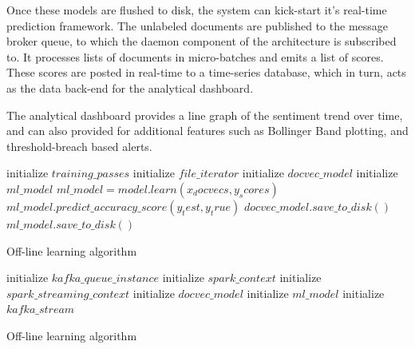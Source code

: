 \documentclass[conference]{IEEEtran}
\begin{document}
        Once these models are flushed to disk, the system can kick-start it's real-time prediction framework. 
        The unlabeled documents are published to the message broker queue, to which the daemon component of the architecture is subscribed to. 
        It processes lists of documents in micro-batches and emits a list of scores. 
        These scores are posted in real-time to a time-series database, which in turn, acts as the data back-end for the analytical dashboard.

        The analytical dashboard provides a line graph of the sentiment trend over time, and can also provided for additional features such as Bollinger Band plotting, and threshold-breach based alerts.

\vspace{5mm}

\begin{algorithm}[ht] \label{offline_module}
    \DontPrintSemicolon 
    \;
    initialize $training\_passes$\;
    initialize $file\_iterator$\;
    initialize $docvec\_model$\;
    initialize $ml\_model$\;
    \;
    \;
    \;
    \;
    $ml\_model = model.learn(x_docvecs, y_scores)$\;
    $ml\_model.predict\_accuracy\_score(y_test, y_true)$\;
    \;
    $docvec\_model.save\_to\_disk()$\;
    $ml\_model.save\_to\_disk()$\;
    \;
    \caption{Off-line learning algorithm}
\end{algorithm}

\begin{algorithm}[ht] \label{online_module}
    \DontPrintSemicolon 
    \;
    initialize $kafka\_queue\_instance$\;
    initialize $spark\_context$\;
    initialize $spark\_streaming\_context$\;
    \;
    initialize $docvec\_model$\;
    initialize $ml\_model$\;
    initialize $kafka\_stream$\;
    \;
    \;
    \caption{Off-line learning algorithm}
\end{algorithm}
\end{document}
